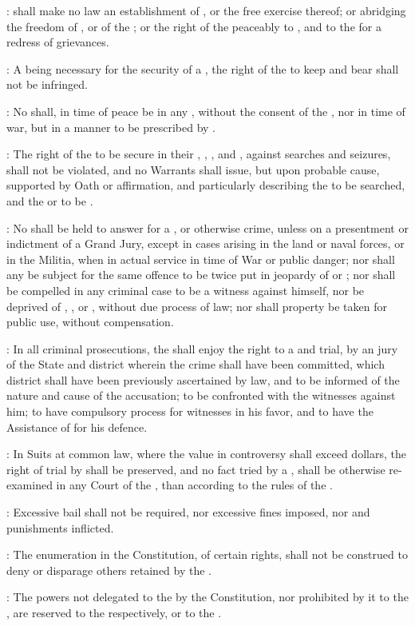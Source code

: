 \documentclass{article}
\begin{document}
\setlength\parskip{2ex}

: \mnoun{} shall make no law  an establishment of \mnoun{}, or  the free exercise thereof; or abridging the freedom of \mnoun{}, or of the \mnoun{}; or the right of the \mnoun{} peaceably to \mverb{}, and to \mverb{} the \mnoun{} for a redress of grievances.


: A \madjective{} \mnoun{} being necessary for the security of a \madjective{} \mnoun{}, the right of the \mnoun{} to keep and bear \mnoun{} shall not be infringed.

: No \mnoun{} shall, in time of peace be \mverb{} in any \mnoun{}, without the consent of the \mnoun{}, nor in time of war, but in a manner to be prescribed by \mnoun{}.

: The right of the \mnoun{} to be secure in their \mnoun{}, \mnoun{}, \mnoun, and \mnoun{}, against \madjective{} searches and seizures, shall not be violated, and no Warrants shall issue, but upon probable cause, supported by Oath or affirmation, and particularly describing the \mnoun{} to be searched, and the \mnoun{} or \mnoun{} to be \mverb{}.

: No \mnoun{} shall be held to answer for a \madjective{}, or otherwise \madjective{} crime, unless on a presentment or indictment of a Grand Jury, except in cases arising in the land or naval forces, or in the Militia, when in actual service in time of War or public danger; nor shall any \mnoun{} be subject for the same offence to be twice put in jeopardy of \mnoun{} or \mnoun{}; nor shall be compelled in any criminal case to be a witness against himself, nor be deprived of \mnoun{}, \mnoun{}, or \mnoun{}, without due process of law; nor shall \madjective{} property be taken for public use, without \madjective{} compensation.

: In all criminal prosecutions, the \mnoun{} shall enjoy the right to a \madjective{} and \madjective{} trial, by an \madjective{} jury of the State and district wherein the crime shall have been committed, which district shall have been previously ascertained by law, and to be informed of the nature and cause of the accusation; to be confronted with the witnesses against him; to have compulsory process for  witnesses in his favor, and to have the Assistance of \mnoun{} for his defence.

: In Suits at common law, where the value in controversy shall exceed  dollars, the right of trial by \mnoun{} shall be preserved, and no fact tried by a \mnoun{}, shall be otherwise re-examined in any Court of the \mpnoun{}, than according to the rules of the \mnoun.

: Excessive bail shall not be required, nor excessive fines imposed, nor \madjective{} and \madjective{} punishments inflicted.

: The enumeration in the Constitution, of certain rights, shall not be construed to deny or disparage others retained by the \mnoun{}.

: The powers not delegated to the \mpnoun{} by the Constitution, nor prohibited by it to the \mpnoun{}, are reserved to the \mpnoun{} respectively, or to the \mnoun.
\end{document}
